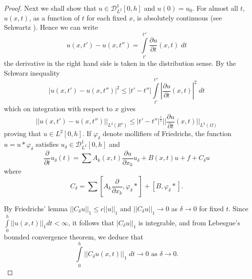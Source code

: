 \begin{proof}
Next we shall show that $u \in \mathscr{D}^1_{L^2} [0, h]$ and
$u(0) = u_0$. For almost all $t$, $u(x,t)$, as a function of $t$ for
each fixed $x$, is absolutely continuous (see Sehwartz
\cite{key1}). Hence we can write   
$$
u(x, t') - u(x, t'') = \int\limits^{t''}_{t'} \frac{\partial
  u}{\partial t} (x, t) \; dt 
$$
the derivative in the right hand side is taken in the distribution
sense. 
By the Schwarz inequality
$$
|u(x, t') - u(x, t'')|^2 \leq | t' - t''| \int\limits^{t''}_{t'}
|\frac{\partial u}{\partial t} (x, t)|^2 \; dt 
$$ 
which on integration with respect to $x$ gives 
$$
|| u(x, t') - u(x, t'')||_{L^2 (\underbar{R}^n)} \leq | t' - 
t''|^{\frac{1}{2}} || \frac{\partial u}{\partial t} (x, t) ||_{L^2
  (\Omega)} 
$$
proving that $u \in L^2 [0, h]$. If $\varphi_{\delta}$ denote
mollifiers of Friedrichs, the function $u = u * \varphi_{\delta}$
satisfies $u_{\delta} \in \mathscr{D}^1_{L^2} [0, h]$ and  
\begin{equation*}
\frac{\partial}{\partial t} u_{\delta}(t) = \sum A_k (x, t)
\frac{\partial u}{\partial x_k} u_{\delta} + B(x, t) u + f +
C_{\delta} u \tag{8.19} \label{chap3-eq8.19} 
\end{equation*}
where\pageoriginale
\begin{equation*}
C_{\delta} = \sum \left[A_k \frac{\partial}{\partial x_k},
  \varphi_{\delta} * \right] + [ B, \varphi_{\delta} *
]. \tag{8.20}\label{chap3-eq8.20}  
\end{equation*}

By Friedrichs' lemma $|| C_{\delta} u ||_1 \leq c || u ||_{1}$ and $||
C_{\delta} u ||_1 \to 0$ as $\delta \to 0$ for fixed $t$. Since
$\int\limits^h_0 || u(x, t) ||_1 dt < \infty$, it follows that
$|C_{\delta} u ||_1$ is integrable, and from Lebesgue's bounded
convergence theorem, we deduce that   
$$ 
\int\limits^h_0 || C_\delta u(x, t) ||_1 \; dt \to 0 \text{ as }
\delta \to 0. 
$$


\end{proof}
